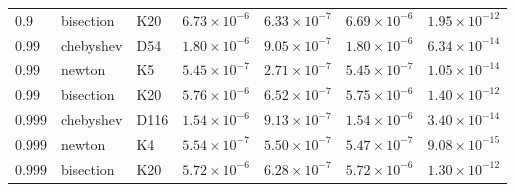 \begin{table}[t]
\begin{tabular}{@{}lllrrrr@{}}
$0.9$ & bisection & K20 & $6.73\times10^{-6}$ & $6.33\times10^{-7}$ & $6.69\times10^{-6}$ & $1.95\times10^{-12}$ \\
$0.99$ & chebyshev & D54 & $1.80\times10^{-6}$ & $9.05\times10^{-7}$ & $1.80\times10^{-6}$ & $6.34\times10^{-14}$ \\
$0.99$ & newton & K5 & $5.45\times10^{-7}$ & $2.71\times10^{-7}$ & $5.45\times10^{-7}$ & $1.05\times10^{-14}$ \\
$0.99$ & bisection & K20 & $5.76\times10^{-6}$ & $6.52\times10^{-7}$ & $5.75\times10^{-6}$ & $1.40\times10^{-12}$ \\
$0.999$ & chebyshev & D116 & $1.54\times10^{-6}$ & $9.13\times10^{-7}$ & $1.54\times10^{-6}$ & $3.40\times10^{-14}$ \\
$0.999$ & newton & K4 & $5.54\times10^{-7}$ & $5.50\times10^{-7}$ & $5.47\times10^{-7}$ & $9.08\times10^{-15}$ \\
$0.999$ & bisection & K20 & $5.72\times10^{-6}$ & $6.28\times10^{-7}$ & $5.72\times10^{-6}$ & $1.30\times10^{-12}$ \\
\bottomrule
\end{tabular}
\end{table}
